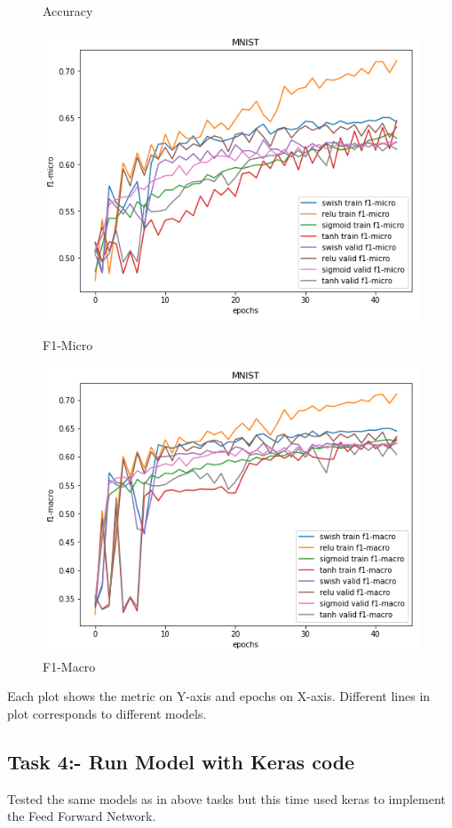 \documentclass{article}
\begin{document}
\begin{figure}[!htb]
	\caption{Accuracy}\label{fig:part_2_task_3_accuracy}
	\endminipage\hfill
	\includegraphics[width=\linewidth]{../output_plots/part_2_task_3_f1-micro.png}
	\caption{F1-Micro}\label{fig:part_2_task_3_f1-micro}
	\endminipage
	\includegraphics[width=\linewidth]{../output_plots/part_2_task_3_f1-macro.png}
	\caption{F1-Macro}\label{fig:part_2_task_3_f1-macro}
	\endminipage
\end{figure}

Each plot shows the metric on Y-axis and epochs on X-axis. Different lines in plot corresponds to different models.

\pagebreak
\subsection{Task 4:- Run Model with Keras code}
Tested the same models as in above tasks but this time used keras to implement the Feed Forward Network.
\end{document}
